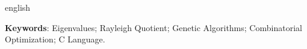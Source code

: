 \begin{resumo}
\begin{otherlanguage*}{english}
    \vspace{\onelineskip}

    \noindent\textbf{Keywords}: Eigenvalues; Rayleigh Quotient; Genetic Algorithms; Combinatorial Optimization; C Language.

    \end{otherlanguage*}
		
    


		
\end{resumo}

\listoffigures*
\thispagestyle{empty}
\clearpage
\cleardoublepage

\listoftables*
\thispagestyle{empty}
\clearpage
\cleardoublepage




\tableofcontents*
\thispagestyle{empty}
\clearpage
\cleardoublepage

\textual









%

\postextual

